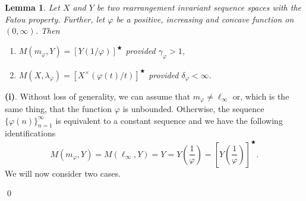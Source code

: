 \documentclass[11pt]{amsart}
\theoremstyle{definition}
\theoremstyle{definition}
\newtheorem{lemma}[theorem]{Lemma}
\theoremstyle{definition}
\theoremstyle{definition}
\theoremstyle{definition}
\theoremstyle{definition}
\theoremstyle{definition}
\theoremstyle{definition}
\numberwithin{equation}{section}
\numberwithin{equation}{section}
\numberwithin{equation}{section}
\theoremstyle{definition}
\theoremstyle{definition}
\theoremstyle{definition}
\theoremstyle{definition}
\theoremstyle{definition}
\theoremstyle{definition}
\renewenvironment{proof}{\noindent {\bf Proof.}}{\qed}
\begin{document}
		\begin{lemma} \label{LEMMA: a'la KLM12/14}
			{\it Let $X$ and $Y$ be two rearrangement invariant sequence spaces with the Fatou property.
				Further, let $\varphi$ be a positive, increasing and concave function on $(0,\infty)$. Then}
			\begin{enumerate}
				\item {\it $M(m_{\varphi},Y) = \left[ Y\left( 1 / \varphi \right) \right]^{\bigstar}$ provided $\gamma_{\varphi} > 1$,}
				\item {\it $M(X,\lambda_{\varphi}) = \left[ X^{\times}\left( \varphi(t) / t \right) \right]^{\bigstar}$ provided $\delta_{\varphi} < \infty$.}
			\end{enumerate}
		\end{lemma}
		\begin{proof}
			{\bf (i)}. Without loss of generality, we can assume that $m_{\varphi} \neq \ell_{\infty}$ or, which is the same thing,
			that the function $\varphi$ is unbounded. Otherwise, the sequence $\{\varphi(n)\}_{n=1}^{\infty}$ is equivalent to a constant
			sequence and we have the following identifications
			\begin{equation*}
				M(m_{\varphi},Y) = M(\ell_{\infty},Y) = Y = Y\left( \frac{1}{\varphi} \right) = \left[ Y\left( \frac{1}{\varphi} \right) \right]^{\bigstar}.
			\end{equation*}
			We will now consider two cases.
			

\end{proof}
\end{document}
